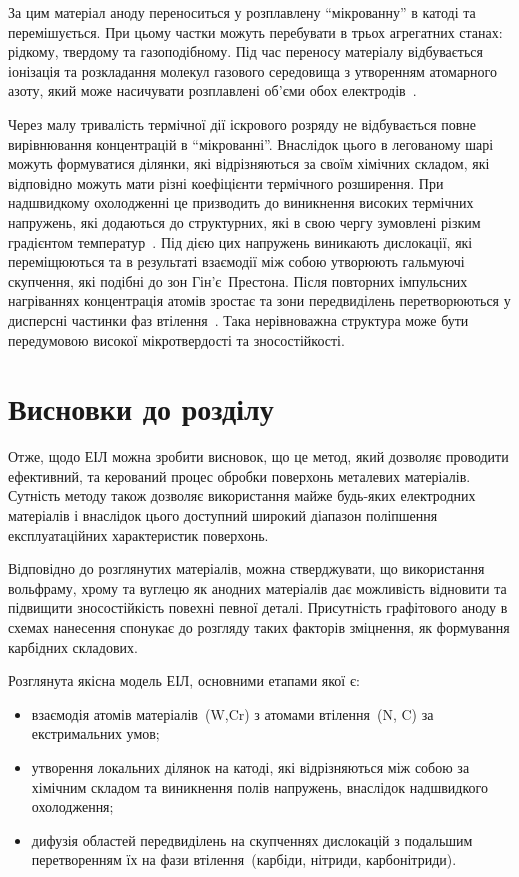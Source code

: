 \documentclass[a4paper,fontsize=14bp,ukrainian]{extreport}
\begin{document}
За цим матеріал аноду переноситься у розплавлену ``мікрованну'' в катоді та перемішується. При цьому частки можуть перебувати в трьох агрегатних станах: рідкому, твердому та газоподібному. Під час переносу матеріалу відбувається іонізація та розкладання молекул газового середовища з утворенням атомарного азоту, який може насичувати розплавлені об'єми обох електродів~\cite{lobachova2012}.

Через малу тривалість термічної дії іскрового розряду не відбувається повне вирівнювання концентрацій в ``мікрованні''. Внаслідок цього в легованому шарі можуть формуватися ділянки, які відрізняються за своїм хімічних складом, які відповідно можуть мати різні коефіцієнти термічного розширення. При надшвидкому охолодженні це призводить до виникнення високих термічних напружень, які додаються до структурних, які в свою чергу зумовлені різким градієнтом температур~\cite{lobachova2012}. Під дією цих напружень виникають дислокації, які переміщюються та в результаті взаємодії між собою утворюють гальмуючі скупчення, які подібні до зон Гін'є~Престона. Після повторних імпульсних нагріваннях концентрація атомів зростає та зони передвиділень перетворюються у дисперсні частинки фаз втілення~\cite{lobachova2012}. Така нерівноважна структура може бути передумовою високої мікротвердості та зносостійкості.

\section{Висновки до розділу~\thechapter}

Отже, щодо ЕІЛ можна зробити висновок, що це метод, який дозволяє проводити ефективний, та керований процес обробки поверхонь металевих матеріалів. Сутність методу також дозволяє використання майже будь-яких електродних матеріалів і внаслідок цього доступний широкий діапазон поліпшення експлуатаційних характеристик поверхонь.

Відповідно до розглянутих матеріалів, можна стверджувати, що використання вольфраму, хрому та вуглецю як анодних матеріалів дає можливість відновити та підвищити зносостійкість повехні певної деталі. Присутність графітового аноду в схемах нанесення спонукає до розгляду таких факторів зміцнення, як формування карбідних складових.

Розглянута якісна модель ЕІЛ, основними етапами якої є:
\begin{itemize}
\item взаємодія атомів матеріалів~(W,Cr) з атомами втілення~(N, C) за екстримальних умов;
\item утворення локальних ділянок на катоді, які відрізняються між собою за хімічним складом та виникнення полів напружень, внаслідок надшвидкого охолодження;
\item дифузія областей передвиділень на скупченнях дислокацій з подальшим перетворенням їх на фази втілення~(карбіди, нітриди, карбонітриди).
\end{itemize}
\end{document}
